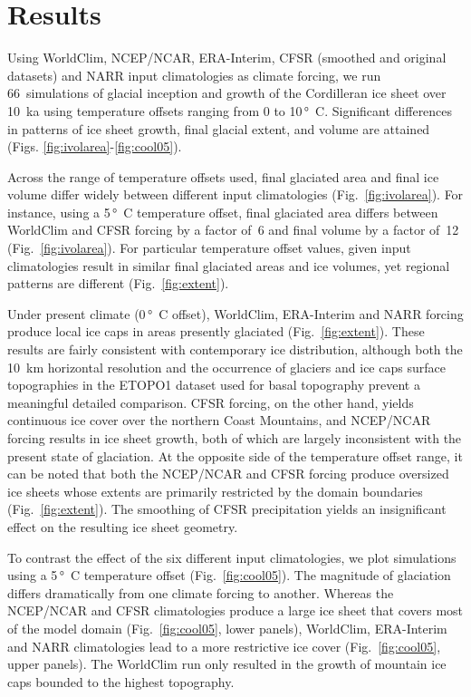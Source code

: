 \section{Results}
\label{sec:results}

Using WorldClim, NCEP/NCAR, ERA-Interim, CFSR (smoothed and original datasets) and NARR input climatologies as climate forcing, we run 66~simulations of glacial inception and growth of the Cordilleran ice sheet over 10~ka using temperature offsets ranging from 0 to 10\,\unit{\degree C}. Significant differences in patterns of ice sheet growth, final glacial extent, and volume are attained (Figs. \ref{fig:ivolarea}-\ref{fig:cool05}).

Across the range of temperature offsets used, final glaciated area and final ice volume differ widely between different input climatologies (Fig.~\ref{fig:ivolarea}). For instance, using a 5\,\unit{\degree C} temperature offset, final glaciated area differs between WorldClim and CFSR forcing by a factor of~6 and final volume by a factor of~12 (Fig.~\ref{fig:ivolarea}). For particular temperature offset values, given input climatologies result in similar final glaciated areas and ice volumes, yet regional patterns are different (Fig.~\ref{fig:extent}).

Under present climate (0\,\unit{\degree C} offset), WorldClim, ERA-Interim and NARR forcing produce local ice caps in areas presently glaciated (Fig.~\ref{fig:extent}). These results are fairly consistent with contemporary ice distribution, although both the 10~km horizontal resolution and the occurrence of glaciers and ice caps surface topographies in the ETOPO1 dataset used for basal topography prevent a meaningful detailed comparison. CFSR forcing, on the other hand, yields continuous ice cover over the northern Coast Mountains, and NCEP/NCAR forcing results in ice sheet growth, both of which are largely inconsistent with the present state of glaciation. At the opposite side of the temperature offset range, it can be noted that both the NCEP/NCAR and CFSR forcing produce oversized ice sheets whose extents are primarily restricted by the domain boundaries (Fig.~\ref{fig:extent}). The smoothing of CFSR precipitation yields an insignificant effect on the resulting ice sheet geometry.

To contrast the effect of the six different input climatologies, we plot simulations using a 5\,\unit{\degree C} temperature offset (Fig.~\ref{fig:cool05}). The magnitude of glaciation differs dramatically from one climate forcing to another. Whereas the NCEP/NCAR and CFSR climatologies produce a large ice sheet that covers most of the model domain (Fig.~\ref{fig:cool05}, lower panels), WorldClim, ERA-Interim and NARR climatologies lead to a more restrictive ice cover (Fig.~\ref{fig:cool05}, upper panels). The WorldClim run only resulted in the growth of mountain ice caps bounded to the highest topography.
